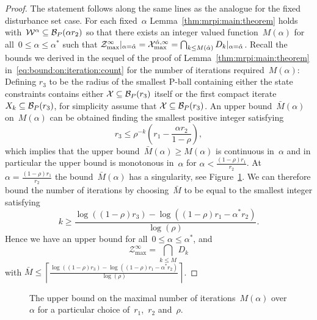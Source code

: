 \begin{proof}
The statement follows along the same lines as the analogue for the fixed disturbance set case.
%
For each fixed~$\alpha$ Lemma~\ref{thm:mrpi:main:theorem} holds with~$\mathcal W^\alpha\subseteq\mathcal B_P(\alpha r_2)$ so that there exists an integer valued function~$M(\alpha)$ for all~$0\leq\alpha\leq\alpha^\ast$ such that $\mathcal Z^{\infty}_{\max}\vert_{\alpha=\hat\alpha} = \mathcal X^{\hat\alpha,\infty}_{\max} =  \bigcap_{k\leq M(\hat\alpha)} D_k\vert_{\alpha=\hat\alpha}$.
%
Recall the bounds we derived in the sequel of the proof of Lemma~\ref{thm:mrpi:main:theorem} in~\eqref{eq:bound:on:iteration:count} for the number of iterations required~$M(\alpha)$:
%
Defining $r_3$ to be the radius of the smallest P-ball containing either the state constraints contains either $\mathcal X\subseteq\mathcal B_P(r_3)$ itself or the first compact iterate~$X_k\subseteq\mathcal B_P(r_3)$, for simplicity assume that $\mathcal X\subseteq\mathcal B_P(r_3)$.
%
An upper bound~$\bar M(\alpha)$ on~$M(\alpha)$ can be obtained finding the smallest positive integer satisfying
%
\begin{equation}
	r_3\leq\rho^{-k}\left(r_1-\frac{\alpha r_2}{1-\rho}\right),
\end{equation}
%
which implies that the upper bound~$\bar M(\alpha)\geq M(\alpha)$ is continuous in~$\alpha$ and in particular the upper bound is monotonous in~$\alpha$ for $\alpha<\frac{(1-\rho)r_1}{r_2}$.
%
At~$\alpha=\frac{(1-\rho)r_1}{r_2}$ the bound~$\bar M(\alpha)$ has a singularity, see Figure~\ref{fig:logarithmic:dependence:of:bound:on:alpha}.
%
We can therefore bound the number of iterations by choosing~$\bar M$ to be equal to the smallest integer satisfying
%
\[
	k\geq \frac{\log((1-\rho)r_3)-\log((1-\rho)r_1-\alpha^\ast r_2)}{\log(\rho)}.
\]
%
Hence we have an upper bound for all~$0\leq\alpha\leq\alpha^\ast$, and
%
$$
	\mathcal Z^{\infty}_{\max} = \bigcap_{k\leq M} D_k
$$
%
with $\bar M\leq\left\lceil\frac{\log((1-\rho)r_3)-\log((1-\rho)r_1-\alpha^\ast r_2)}{\log(\rho)}\right\rceil$.
\end{proof}
%
%
\begin{figure}\centering
{}
\caption[Dependence of upper bound on iteration count for MRPI set on~$\alpha$]{The upper bound on the maximal number of iterations~$M(\alpha)$ over $\alpha$ for a particular choice of~$r_1$,~$r_2$ and~$\rho$.}
\label{fig:logarithmic:dependence:of:bound:on:alpha}
\end{figure}
